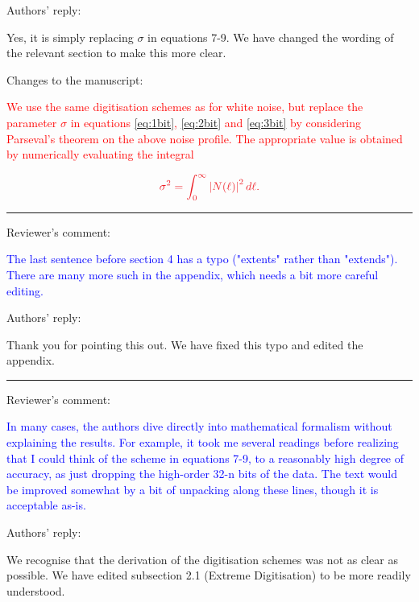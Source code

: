 \documentclass{article}
\newcommand{\changed}[1]{\textcolor{Red}{#1}}
\newcommand{\question}[1]{\textcolor{Blue}{#1}}
\newlength\tindent
\renewcommand{\indent}{\hspace*{\tindent}}
\begin{document}
\vspace{0.25cm}

Authors' reply:

\indent Yes, it is simply replacing $\sigma$ in equations 7-9. We have changed the wording of the relevant section to make this more clear.

\vspace{0.25cm}

Changes to the manuscript:

\indent \changed{We use the same digitisation schemes as for white noise, but replace the parameter $\sigma$ in equations \ref{eq:1bit}, \ref{eq:2bit} and \ref{eq:3bit} by considering Parseval's theorem on the above noise profile. The appropriate value is obtained by numerically evaluating the integral}

\[ \changed{
\sigma^2 = \int_0^\infty \left| N(\ell) \right|^2 d\ell. }
\]

\vspace{0.5cm}

\hrule

\vspace{0.5cm}

Reviewer's comment:

\indent \question{The last sentence before section 4 has a typo ("extents" rather than "extends"). There are many more such in the appendix, which needs a bit more careful editing.}

\vspace{0.25cm}

Authors' reply:

\indent Thank you for pointing this out. We have fixed this typo and edited the appendix.

\vspace{0.5cm}

\hrule

\vspace{0.5cm}

Reviewer's comment:

\indent \question{In many cases, the authors dive directly into mathematical formalism without explaining the results. For example, it took me several readings before realizing that I could think of the scheme in equations 7-9, to a reasonably high degree of accuracy, as just dropping the high-order 32-n bits of the data. The text would be improved somewhat by a bit of unpacking along these lines, though it is acceptable as-is.}

\vspace{0.25cm}

Authors' reply:

\indent We recognise that the derivation of the digitisation schemes was not as clear as possible. We have edited subsection 2.1 (Extreme Digitisation) to be more readily understood.
\end{document}
